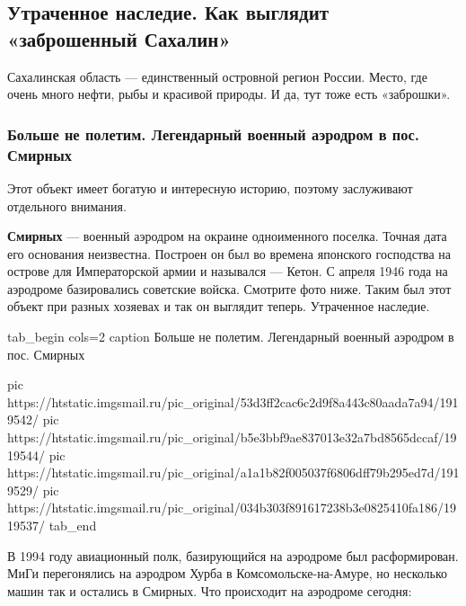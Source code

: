  
 
 
 
 
 
\subsection{Утраченное наследие. Как выглядит «заброшенный Сахалин»}
\label{sec:03_12_2020.news.ru.mail_ru.1.sahalin}


Сахалинская область — единственный островной регион России. Место, где очень
много нефти, рыбы и красивой природы. И да, тут тоже есть «заброшки».

\subsubsection{Больше не полетим. Легендарный военный аэродром в пос. Смирных}

Этот объект имеет богатую и интересную историю, поэтому заслуживают отдельного
внимания. 

\textbf{Смирных} — военный аэродром на окраине одноименного поселка. Точная
дата его основания неизвестна. Построен он был во времена японского господства
на острове для Императорской армии и назывался — Кетон. С апреля 1946 года на
аэродроме базировались советские войска. Смотрите фото ниже. Таким был этот
объект при разных хозяевах и так он выглядит теперь. Утраченное наследие. 

\ifcmt
tab_begin cols=2
  caption Больше не полетим. Легендарный военный аэродром в пос. Смирных

  pic https://htstatic.imgsmail.ru/pic_original/53d3ff2cac6c2d9f8a443c80aada7a94/1919542/
  pic https://htstatic.imgsmail.ru/pic_original/b5e3bbf9ae837013e32a7bd8565dccaf/1919544/
  pic https://htstatic.imgsmail.ru/pic_original/a1a1b82f005037f6806dff79b295ed7d/1919529/
  pic https://htstatic.imgsmail.ru/pic_original/034b303f891617238b3e0825410fa186/1919537/
tab_end
\fi

В 1994 году авиационный полк, базирующийся на аэродроме был расформирован. МиГи
перегонялись на аэродром Хурба в Комсомольске-на-Амуре, но несколько машин так
и остались в Смирных. Что происходит на аэродроме сегодня:

